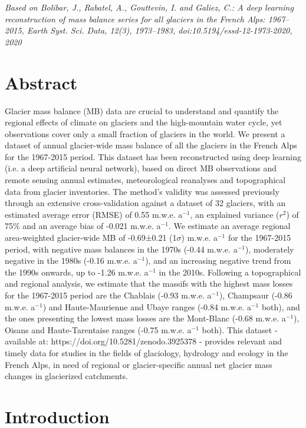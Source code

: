 \textit{Based on Bolibar, J., Rabatel, A., Gouttevin, I. and Galiez, C.: A deep learning reconstruction of mass balance series for all glaciers in the French Alps: 1967–2015, Earth Syst. Sci. Data, 12(3), 1973–1983, doi:10.5194/essd-12-1973-2020, 2020}


\section{Abstract}

Glacier mass balance (MB) data are crucial to understand and quantify the regional effects of climate on glaciers and the high-mountain water cycle, yet observations cover only a small fraction of glaciers in the world. We present a dataset of annual glacier-wide mass balance of all the glaciers in the French Alps for the 1967-2015 period. This dataset has been reconstructed using deep learning (i.e. a deep artificial neural network), based on direct MB observations and remote sensing annual estimates, meteorological reanalyses and topographical data from glacier inventories. The method's validity was assessed previously through an extensive cross-validation against a dataset of 32 glaciers, with an estimated average error (RMSE) of 0.55 m.w.e. a$^{-1}$,  an explained variance ($r^{2}$) of 75\% and an average bias of -0.021 m.w.e. a$^{-1}$. We estimate an average regional area-weighted glacier-wide MB of -0.69±0.21 (1$\sigma$) m.w.e. a$^{-1}$ for the 1967-2015 period, with negative mass balances in the 1970s (-0.44 m.w.e. a$^{-1}$), moderately negative in the 1980s (-0.16 m.w.e. a$^{-1}$), and an increasing negative trend from the 1990s onwards, up to -1.26 m.w.e. a$^{-1}$ in the 2010s. Following a topographical and regional analysis, we estimate that the massifs with the highest mass losses for the 1967-2015 period are the Chablais (-0.93 m.w.e. a$^{-1}$), Champsaur (-0.86 m.w.e. a$^{-1}$) and  Haute-Maurienne and Ubaye ranges (-0.84 m.w.e. a$^{-1}$ both), and the ones presenting the lowest mass losses are the Mont-Blanc (-0.68 m.w.e. a$^{-1}$), Oisans and Haute-Tarentaise ranges (-0.75 m.w.e. a$^{-1}$ both). This dataset - available at: https://doi.org/10.5281/zenodo.3925378
 \citep{bolibar_deep_2020} - provides relevant and timely data for studies in the fields of glaciology, hydrology and ecology in the French Alps, in need of regional or glacier-specific annual net glacier mass changes in glacierized catchments.
 
\section{Introduction}

